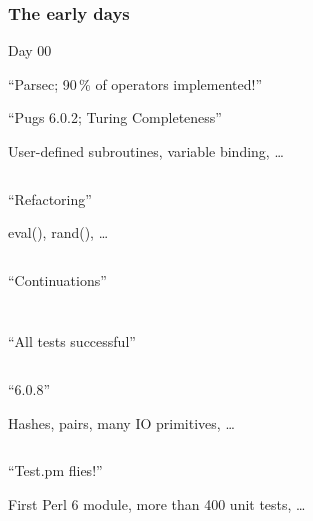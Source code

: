 \documentclass[12pt,compress,english,utf8,t]{beamer}
\begin{document}
\begin{frame}[fragile]\frametitle{The early days}
  \begin{Mdescription}{Day 00}
    \item<1-2|only@1-2>[Day 4] ``Parsec; 90\,\% of operators implemented!''



    \item<3|only@3>[Day 8] ``Pugs 6.0.2; Turing Completeness''

    User-defined subroutines, variable binding, \ldots\par
    \inputminted{haskell}{code-snippets/day8-eval.hs}

    \item<4|only@4>[Day 12] ``Refactoring''

    eval(), rand(), \ldots\par
    \inputminted{haskell}{code-snippets/day12-prim.hs}

    \item<5|only@5>[Day 13] ``Continuations''

    \inputminted{haskell}{code-snippets/day13-monads.hs}
    \bigskip
    \inputminted{haskell}{code-snippets/day13-ast.hs}

    \item<6|only@6>[Day 14] ``All tests successful''

    \inputminted{perl}{code-snippets/day14-basic.pl}

    \item<7|only@7>[Day 20] ``6.0.8''

    Hashes, pairs, many IO primitives, \ldots\par
    \inputminted{perl}{code-snippets/day20-ycombinator.pl}

    \item<8|only@8>[Day 23] ``Test.pm flies!''

    First Perl 6 module, more than 400 unit tests, \ldots\par
    \inputminted{perl}{code-snippets/day23-test.pm}
  \end{Mdescription}
\end{frame}
\end{document}
